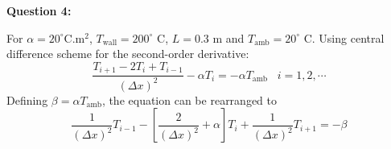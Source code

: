 \documentclass[12pts,a4paper,amsmath,amssymb,floatfix]{article}%
\newcommand{\frc}{\displaystyle\frac}
\begin{document}
\clearpage

\begin{flushleft}
{\bf Question 4:}
\end{flushleft}
For $\alpha=20^{\circ}$C.m$^{2}$, $T_{\text{wall}}=200^{\circ}$ C, $L=0.3$ m and $T_{\text{amb}}=20^{\circ}$ C. Using central difference scheme for the second-order derivative:
\begin{displaymath}
\frc{T_{i+1}-2T_{i}+T_{i-1}}{\left(\Delta x\right)^{2}} - \alpha T_{i}= -\alpha T_{\text{amb}}\;\;\;i=1,2,\cdots
\end{displaymath}
Defining $\beta = \alpha T_{\text{amb}}$, the equation can be rearranged to
\begin{displaymath}
\frc{1}{\left(\Delta x\right)^{2}} T_{i-1}-\left[\frc{2}{\left(\Delta x\right)^{2}} +\alpha\right]T_{i} + \frc{1}{\left(\Delta x\right)^{2}}T_{i+1}=-\beta
\end{displaymath}
\end{document}
